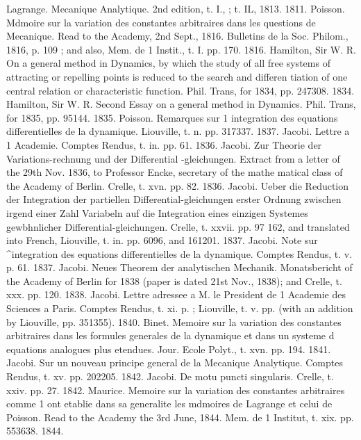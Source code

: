 \documentclass[11pt,a4paper]{book}
\begin{document}

Lagrange.
Mecanique Analytique.
2nd
edition,
t.
I.,
;
t.
IL,
1813.
1811.
Poisson.
Mdmoire
sur
la
variation
des
constantes
arbitraires
dans
les
questions
de
Mecanique.
Read
to
the
Academy, 2nd
Sept.,
1816.
Bulletins de
la
Soc. Philom.,
1816,
p. 109
;
and
also, Mem. de
1 Instit.,
t.
I.
pp. 170.
1816.
Hamilton, Sir W. R.
On
a
general
method
in
Dynamics, by which
the study of
all
free
systems
of
attracting or
repelling points
is
reduced
to the search and
differen
tiation
of
one
central
relation
or
characteristic
function.
Phil.
Trans,
for
1834,
pp. 247308.
1834.
Hamilton,
Sir W. R.
Second Essay on a
general
method
in
Dynamics.
Phil.
Trans,
for 1835,
pp. 95144.
1835.
Poisson.
Remarques
sur
1 integration
des
equations
differentielles
de
la
dynamique.
Liouville,
t.
n.
pp. 317337.
1837.
Jacobi.
Lettre a
1 Academie.
Comptes Rendus,
t.
in.
pp.
61.
1836.
Jacobi.
Zur Theorie der Variations-rechnung und
der
Differential -gleichungen.
Extract
from
a
letter
of the
29th
Nov.
1836,
to
Professor Encke,
secretary of
the mathe
matical
class of the Academy of Berlin.
Crelle,
t. xvn.
pp.
82.
1836.
Jacobi.
Ueber
die
Reduction
der
Integration
der
partiellen
Differential-gleichungen
erster
Ordnung
zwischen
irgend
einer
Zahl
Variabeln
auf
die
Integration
eines
einzigen Systemes gewbhnlicher Differential-gleichungen.
Crelle,
t. xxvii. pp. 97
162,
and
translated into French,
Liouville,
t.
in.
pp. 6096, and 161201.
1837.
Jacobi.
Note
sur
^integration
des
equations
differentielles
de
la
dynamique.
Comptes
Rendus,
t.
v.
p.
61.
1837.
Jacobi.
Neues
Theorem
der
analytischen
Mechanik.
Monatsbericht
of
the
Academy
of
Berlin
for
1838 (paper
is dated
21st Nov., 1838);
and
Crelle,
t. xxx.
pp.
120.
1838.
Jacobi.
Lettre
adressee
a
M.
le
President
de
1 Academie
des
Sciences
a
Paris.
Comptes
Rendus,
t.
xi.
p.
;
Liouville,
t.
v.
pp.
(with an
addition by
Liouville, pp. 351355).
1840.
Binet.
Memoire
sur
la
variation
des
constantes
arbitraires dans
les
formules generales
de
la
dynamique
et
dans
un
systeme
d equations
analogues
plus
etendues.
Jour.
Ecole
Polyt.,
t. xvn.
pp. 194.
1841.
Jacobi.
Sur
un
nouveau
principe
general
de
la
Mecanique
Analytique.
Comptes
Rendus,
t. xv.
pp. 202205.
1842.
Jacobi.
De motu puncti
singularis.
Crelle,
t. xxiv.
pp.
27.
1842.
Maurice.
Memoire
sur
la
variation des constantes
arbitraires comme
1 ont
etablie dans
sa
generalite
les mdmoires de Lagrange
et
celui de
Poisson.
Read
to the Academy
the 3rd June,
1844.
Mem. de
1 Institut,
t.
xix.
pp. 553638.
1844.

\end{document}
